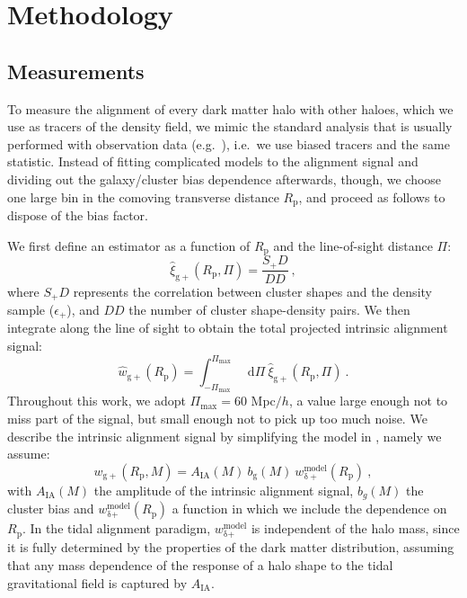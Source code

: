 \documentclass[a4paper,fleqn,usenatbib]{mnras}
\newcommand*\dif{\mathop{}\!\mathrm{d}} 	%
\begin{document}
\section{Methodology}
\label{sec:method}
\subsection{Measurements}
\label{subsec:measurements}
To measure the alignment of every dark matter halo with other haloes, which we use as tracers of the density field, we mimic the standard analysis that is usually performed with observation data (e.g.\ \citealt{vanUitertJoachimi2017}), i.e.\ we use biased tracers and the same statistic. Instead of fitting complicated models to the alignment signal and dividing out the galaxy/cluster bias dependence afterwards, though, we choose one large bin in the comoving transverse distance $R_{\mathrm{p}}$, and proceed as follows to dispose of the bias factor.

We first define an estimator as a function of $R_{\mathrm{p}}$ and the line-of-sight distance $\Pi$:
\begin{equation}
    \hat{\xi}_{\mathrm{g+}}(R_{\mathrm{p}}, \Pi) = \frac{S_+ D}{D D} \ ,
	\label{eq:xigphat}
\end{equation}
where $S_+ D$ represents the correlation between cluster shapes and the density sample ($\epsilon_{+}$), and $D D$ the number of cluster shape-density pairs. We then integrate along the line of sight to obtain the total projected intrinsic alignment signal:
\begin{equation}
   \hat{w}_{\mathrm{g+}} (R_{\mathrm{p}}) = \int _{-\Pi_{\mathrm{max}}}^{\Pi_{\mathrm{max}}} \dif \Pi \ \hat{\xi}_{\mathrm{g+}}(R_{\mathrm{p}}, \Pi) \ .
	\label{eq:wgphat}
\end{equation}
Throughout this work, we adopt $\Pi_{\mathrm{max}} = 60 $ Mpc$/h$, a value large enough not to miss part of the signal, but small enough not to pick up too much noise. 
We describe the intrinsic alignment signal by simplifying the model in \citet[equation 5]{vanUitertJoachimi2017}, namely we assume:
\begin{equation}
    w_{\mathrm{g+}} (R_{\mathrm{p}}, M)=A_{\mathrm{IA}} (M) \ b_{\mathrm{g}} (M)\ w_{\mathrm{\delta +}}^{\mathrm{model}} (R_{\mathrm{p}}) \ , 
	\label{eq:wgp}
\end{equation}
with $A_{\mathrm{IA}} (M)$ the amplitude of the intrinsic alignment signal, $b_g (M)$ the cluster bias and $w_{\mathrm{\delta} \mathrm{+}}^{\mathrm{model}} (R_{\mathrm{p}})$ a function in which we include the dependence on $R_{\mathrm{p}}$. In the tidal alignment paradigm, $w_{\mathrm{\delta} \mathrm{+}}^{\mathrm{model}}$ is independent of the halo mass, since it is fully determined by the properties of the dark matter distribution, assuming that any mass dependence of the response of a halo shape to the tidal gravitational field is captured by $A_{\mathrm{IA}}$. 
\end{document}
